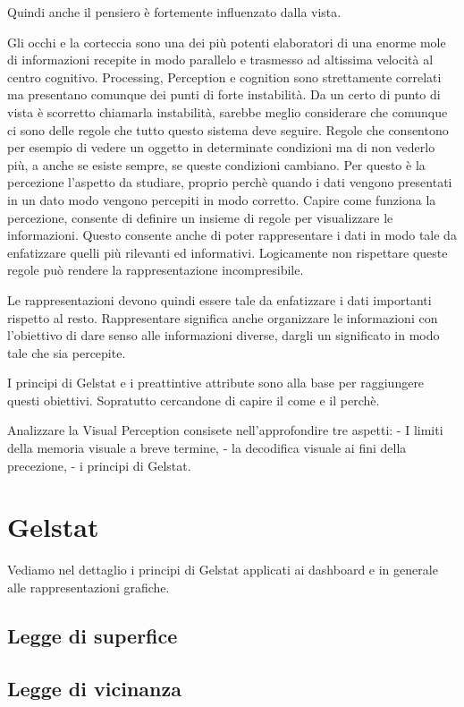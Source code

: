 \documentclass{ium}
\begin{document}
Quindi anche il pensiero è fortemente influenzato dalla vista.

Gli occhi e la corteccia sono una dei più potenti elaboratori di una enorme mole di informazioni recepite in modo parallelo e trasmesso ad altissima velocità al centro cognitivo. Processing, Perception e cognition sono strettamente correlati ma presentano comunque dei punti di forte instabilità. Da un certo di punto di vista è scorretto chiamarla instabilità, sarebbe meglio considerare che comunque ci sono delle regole che tutto questo sistema deve seguire. Regole che consentono per esempio di vedere un oggetto in determinate condizioni ma di non vederlo più, a anche se esiste sempre, se queste condizioni cambiano.
Per questo è la percezione l'aspetto da studiare, proprio perchè quando i dati vengono presentati in un dato modo vengono percepiti in modo corretto. Capire come  funziona la percezione, consente di definire un insieme di regole per visualizzare le informazioni. Questo consente anche di poter rappresentare i dati in modo tale da enfatizzare quelli più rilevanti ed informativi.
Logicamente non rispettare queste regole può rendere la rappresentazione incompresibile.

Le rappresentazioni devono quindi essere tale da enfatizzare i dati importanti rispetto al resto. Rappresentare significa anche organizzare le informazioni con l'obiettivo di dare senso alle informazioni diverse, dargli un significato in modo tale che sia percepite.

I principi di Gelstat e i preattintive attribute sono alla base per raggiungere questi obiettivi. Sopratutto cercandone di capire il come e il perchè.

Analizzare la Visual Perception consisete nell'approfondire tre aspetti: 
- I limiti della memoria visuale a breve termine,
- la decodifica visuale ai fini della precezione,
- i principi di Gelstat.


\section{Gelstat}
Vediamo nel dettaglio i principi di Gelstat applicati ai dashboard e in generale alle rappresentazioni grafiche.
\subsection{Legge di superfice}
\subsection{Legge di vicinanza}
\end{document}
